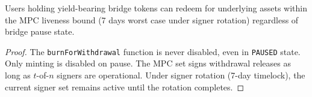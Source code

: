 \begin{property}
Users holding yield-bearing bridge tokens can redeem for underlying assets within the MPC liveness bound (7 days worst case under signer rotation) regardless of bridge pause state.
\end{property}

\begin{proof}
The \texttt{burnForWithdrawal} function is never disabled, even in \texttt{PAUSED} state. Only minting is disabled on pause. The MPC set signs withdrawal releases as long as $t$-of-$n$ signers are operational. Under signer rotation (7-day timelock), the current signer set remains active until the rotation completes.
\end{proof}

